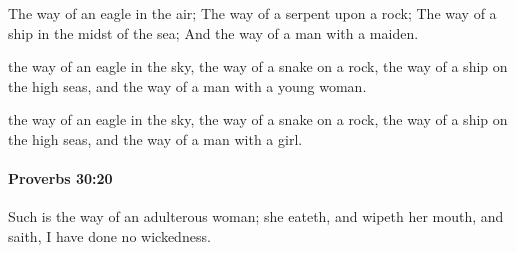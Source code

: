			\begin{versebox}
					\item[BHS] 
					\item[ASV] The way of an eagle in the air; The way of a serpent upon a rock; The way of a ship in the midst of the sea; And the way of a man with a maiden.
					\item[NIV] the way of an eagle in the sky, the way of a snake on a rock, the way of a ship on the high seas, and the way of a man with a young woman.
					\item[NRSV] the way of an eagle in the sky, the way of a snake on a rock, the way of a ship on the high seas, and the way of a man with a girl.
			\end{versebox}

		\paragraph{Proverbs 30:20} %
			\label{PROVERBS-30-20}

			Such is the way of an adulterous woman; she eateth, and wipeth her mouth, and saith, I have done no wickedness.

